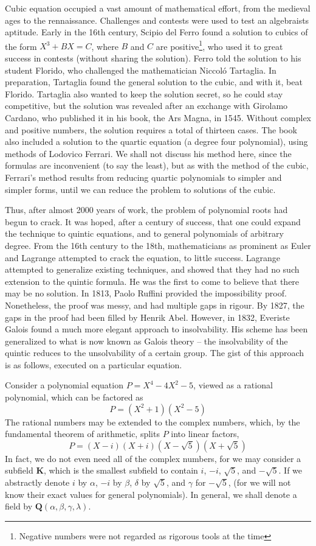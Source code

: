 Cubic equation occupied a vast amount of mathematical effort, from the medieval ages to the rennaissance. Challenges and contests were used to test an algebraists aptitude. Early in the 16th century, Scipio del Ferro found a solution to cubics of the form $X^3 + BX = C$, where $B$ and $C$ are positive\footnote{Negative numbers were not regarded as rigorous tools at the time}, who used it to great success in contests (without sharing the solution). Ferro told the solution to his student Florido, who challenged the mathematician Niccol\'{o} Tartaglia. In preparation, Tartaglia found the general solution to the cubic, and with it, beat Florido. Tartaglia also wanted to keep the solution secret, so he could stay competitive, but the solution was revealed after an exchange with Girolamo Cardano, who published it in his book, the Ars Magna, in 1545. Without complex and positive numbers, the solution requires a total of thirteen cases. The book also included a solution to the quartic equation (a degree four polynomial), using methods of Lodovico Ferrari. We shall not discuss his method here, since the formulas are inconvenient (to say the least), but as with the method of the cubic, Ferrari's method results from reducing quartic polynomials to simpler and simpler forms, until we can reduce the problem to solutions of the cubic.

Thus, after almost 2000 years of work, the problem of polynomial roots had begun to crack. It was hoped, after a century of success, that one could expand the technique to quintic equations, and to general polynomials of arbitrary degree. From the 16th century to the 18th, mathematicians as prominent as Euler and Lagrange attempted to crack the equation, to little success. Lagrange attempted to generalize existing techniques, and showed that they had no such extension to the quintic formula. He was the first to come to believe that there may be no solution. In 1813, Paolo Ruffini provided the impossibility proof. Nonetheless, the proof was messy, and had multiple gaps in rigour. By 1827, the gaps in the proof had been filled by Henrik Abel. However, in 1832, Everiste Galois found a much more elegant approach to insolvability. His scheme has been generalized to what is now known as Galois theory -- the insolvability of the quintic reduces to the unsolvability of a certain group. The gist of this approach is as follows, executed on a particular equation.

Consider a polynomial equation $P = X^4 - 4X^2 - 5$, viewed as a rational polynomial, which can be factored as
%
\[ P = (X^2 + 1)(X^2 - 5) \]
%
The rational numbers may be extended to the complex numbers, which, by the fundamental theorem of arithmetic, splits $P$ into linear factors,
%
\[ P = (X - i)(X + i)(X - \sqrt{5})(X + \sqrt{5}) \]
%
In fact, we do not even need all of the complex numbers, for we may consider a subfield $\mathbf{K}$, which is the smallest subfield to contain $i$, $-i$, $\sqrt{5}$, and $-\sqrt{5}$. If we abstractly denote $i$ by $\alpha$, $-i$ by $\beta$, $\delta$ by $\sqrt{5}$, and $\gamma$ for $-\sqrt{5}$, (for we will not know their exact values for general polynomials). In general, we shall denote a field by $\mathbf{Q}(\alpha, \beta, \gamma, \lambda)$.


